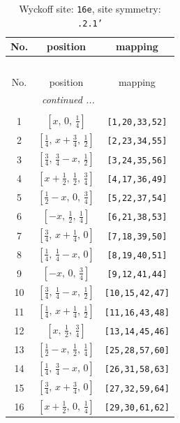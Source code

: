 \documentclass[fleqn,8pt]{jsarticle}
\begin{document}
\renewcommand{\arraystretch}{1.2}
\begin{longtable}{ccc}
\caption{Wyckoff site: {\tt 16e}, site symmetry: {\tt .2.1'}}
 \\
 \hline \hline
No. & position & mapping \\ \hline \endfirsthead

\multicolumn{2}{l}{\tablename\ \thetable{}} \\
 \hline \hline
No. & position & mapping \\ \hline \endhead

 \hline \hline
\multicolumn{2}{r}{\footnotesize\it continued ...} \\ \endfoot

 \hline \hline
\multicolumn{2}{r}{} \\ \endlastfoot

1 & $\left[ x,\, 0,\, \frac{1}{4} \right]$ & {\tt [1,20,33,52]} \\ \hline
2 & $\left[ \frac{1}{4},\, x + \frac{3}{4},\, \frac{1}{2} \right]$ & {\tt [2,23,34,55]} \\ \hline
3 & $\left[ \frac{3}{4},\, \frac{3}{4} - x,\, \frac{1}{2} \right]$ & {\tt [3,24,35,56]} \\ \hline
4 & $\left[ x + \frac{1}{2},\, \frac{1}{2},\, \frac{3}{4} \right]$ & {\tt [4,17,36,49]} \\ \hline
5 & $\left[ \frac{1}{2} - x,\, 0,\, \frac{3}{4} \right]$ & {\tt [5,22,37,54]} \\ \hline
6 & $\left[ - x,\, \frac{1}{2},\, \frac{1}{4} \right]$ & {\tt [6,21,38,53]} \\ \hline
7 & $\left[ \frac{3}{4},\, x + \frac{1}{4},\, 0 \right]$ & {\tt [7,18,39,50]} \\ \hline
8 & $\left[ \frac{1}{4},\, \frac{1}{4} - x,\, 0 \right]$ & {\tt [8,19,40,51]} \\ \hline
9 & $\left[ - x,\, 0,\, \frac{3}{4} \right]$ & {\tt [9,12,41,44]} \\ \hline
10 & $\left[ \frac{3}{4},\, \frac{1}{4} - x,\, \frac{1}{2} \right]$ & {\tt [10,15,42,47]} \\ \hline
11 & $\left[ \frac{1}{4},\, x + \frac{1}{4},\, \frac{1}{2} \right]$ & {\tt [11,16,43,48]} \\ \hline
12 & $\left[ x,\, \frac{1}{2},\, \frac{3}{4} \right]$ & {\tt [13,14,45,46]} \\ \hline
13 & $\left[ \frac{1}{2} - x,\, \frac{1}{2},\, \frac{1}{4} \right]$ & {\tt [25,28,57,60]} \\ \hline
14 & $\left[ \frac{1}{4},\, \frac{3}{4} - x,\, 0 \right]$ & {\tt [26,31,58,63]} \\ \hline
15 & $\left[ \frac{3}{4},\, x + \frac{3}{4},\, 0 \right]$ & {\tt [27,32,59,64]} \\ \hline
16 & $\left[ x + \frac{1}{2},\, 0,\, \frac{1}{4} \right]$ & {\tt [29,30,61,62]} \\
\end{longtable}
\end{document}
